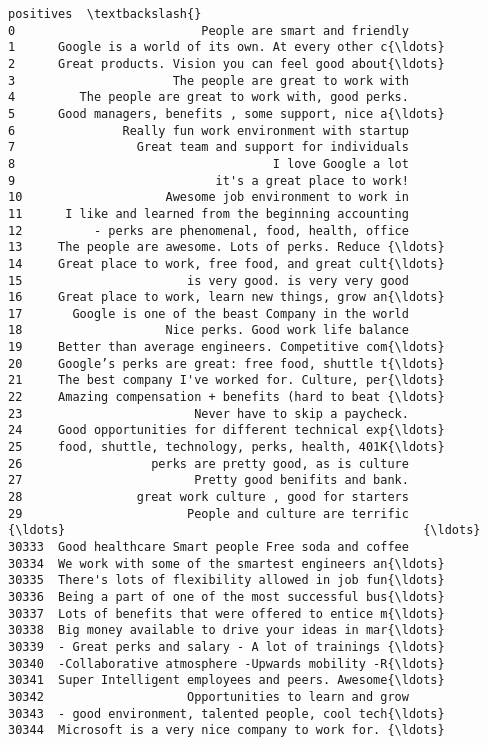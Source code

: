 \documentclass[11pt]{article}
\begin{document}
\begin{tcolorbox}[breakable, boxrule=.5pt, size=fbox, pad at break*=1mm, opacityfill=0]
\begin{Verbatim}[commandchars=\\\{\}]
                                               positives  \textbackslash{}
0                          People are smart and friendly
1      Google is a world of its own. At every other c{\ldots}
2      Great products. Vision you can feel good about{\ldots}
3                      The people are great to work with
4         The people are great to work with, good perks.
5      Good managers, benefits , some support, nice a{\ldots}
6               Really fun work environment with startup
7                 Great team and support for individuals
8                                    I love Google a lot
9                            it's a great place to work!
10                    Awesome job environment to work in
11      I like and learned from the beginning accounting
12          - perks are phenomenal, food, health, office
13     The people are awesome. Lots of perks. Reduce {\ldots}
14     Great place to work, free food, and great cult{\ldots}
15                       is very good. is very very good
16     Great place to work, learn new things, grow an{\ldots}
17       Google is one of the beast Company in the world
18                    Nice perks. Good work life balance
19     Better than average engineers. Competitive com{\ldots}
20     Google’s perks are great: free food, shuttle t{\ldots}
21     The best company I've worked for. Culture, per{\ldots}
22     Amazing compensation + benefits (hard to beat {\ldots}
23                        Never have to skip a paycheck.
24     Good opportunities for different technical exp{\ldots}
25     food, shuttle, technology, perks, health, 401K{\ldots}
26                  perks are pretty good, as is culture
27                        Pretty good benifits and bank.
28                great work culture , good for starters
29                       People and culture are terrific
{\ldots}                                                  {\ldots}
30333  Good healthcare Smart people Free soda and coffee
30334  We work with some of the smartest engineers an{\ldots}
30335  There's lots of flexibility allowed in job fun{\ldots}
30336  Being a part of one of the most successful bus{\ldots}
30337  Lots of benefits that were offered to entice m{\ldots}
30338  Big money available to drive your ideas in mar{\ldots}
30339  - Great perks and salary - A lot of trainings {\ldots}
30340  -Collaborative atmosphere -Upwards mobility -R{\ldots}
30341  Super Intelligent employees and peers. Awesome{\ldots}
30342                    Opportunities to learn and grow
30343  - good environment, talented people, cool tech{\ldots}
30344  Microsoft is a very nice company to work for. {\ldots}

\end{Verbatim}
\end{tcolorbox}
\end{document}
